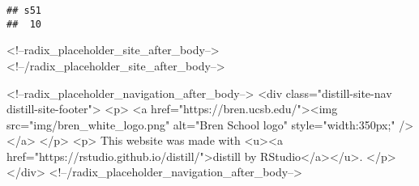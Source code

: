 \documentclass[
]{article}
\begin{document}
\begin{verbatim}
## s51 
##  10
\end{verbatim}

<!--radix_placeholder_site_after_body-->
<!--/radix_placeholder_site_after_body-->

<!--radix_placeholder_navigation_after_body-->
<div class="distill-site-nav distill-site-footer">
<p>
<a href="https://bren.ucsb.edu/"><img src="img/bren_white_logo.png" alt="Bren School logo" style="width:350px;" /></a>
</p>
<p>
  This website was made with <u><a href="https://rstudio.github.io/distill/">distill by RStudio</a></u>.
</p>
</div>
<!--/radix_placeholder_navigation_after_body-->
\end{document}
